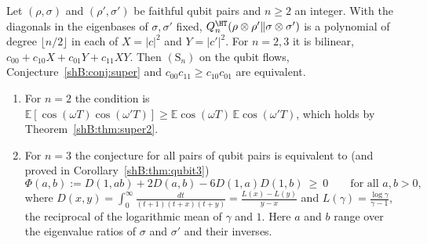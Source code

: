 \begin{proposition}\label{shB:prop:qubitn}
Let $(\rho,\sigma)$ and $(\rho',\sigma')$ be faithful qubit pairs and $n\ge2$ an integer. With the diagonals in the eigenbases of $\sigma,\sigma'$ fixed, $Q^\HT_n(\rho\otimes\rho'\|\sigma\otimes\sigma')$ is a polynomial of degree $\lfloor n/2\rfloor$ in each of $X=|c|^2$ and $Y=|c'|^2$. For $n=2,3$ it is bilinear, $c_{00}+c_{10}X+c_{01}Y+c_{11}XY$. Then $(\mathrm S_n)$ on the qubit flows, Conjecture~\ref{shB:conj:super} and $c_{00}c_{11}\ge c_{10}c_{01}$ are equivalent.
\begin{enumerate}[label=(\alph*)]
\item For $n=2$ the condition is $\mathbb E[\cos(\omega T)\cos(\omega'T)]\ge\mathbb E\cos(\omega T)\,\mathbb E\cos(\omega'T)$, which holds by Theorem~\ref{shB:thm:super2}.
\item For $n=3$ the conjecture for all pairs of qubit pairs is equivalent to (and proved in Corollary~\ref{shB:thm:qubit3})
\[
\Phi(a,b):=D(1,ab)+2D(a,b)-6D(1,a)D(1,b)\ \ge\ 0\qquad\text{for all }a,b>0,
\]
where $D(x,y)=\int_0^\infty\frac{dt}{(t+1)(t+x)(t+y)}=\frac{L(x)-L(y)}{y-x}$ and $L(\gamma)=\frac{\log\gamma}{\gamma-1}$, the reciprocal of the logarithmic mean of $\gamma$ and $1$. Here $a$ and $b$ range over the eigenvalue ratios of $\sigma$ and $\sigma'$ and their inverses.
\end{enumerate}
\end{proposition}

